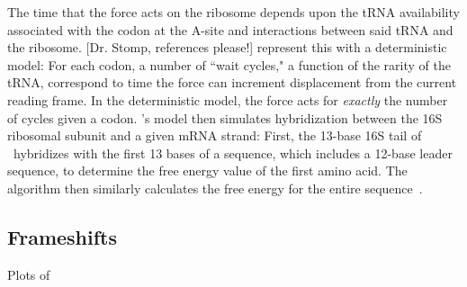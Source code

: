 \documentclass[12pt]{article}
\begin{document}
The time that the force acts on the ribosome depends upon
the tRNA availability associated with the codon at the A-site 
and interactions between said tRNA and the ribosome. [Dr. Stomp, references please!]
\citeauthor{lalit:mechanics} represent this with a deterministic model: For each codon,
a number of ``wait cycles," a function of the rarity of the
tRNA, correspond to time the force can
increment displacement from the current reading frame.  In the
deterministic model, the force acts for \emph{exactly} the number
of cycles given a codon. \citet{lalit:mechanics}'s model then
simulates hybridization between the
16S ribosomal subunit and a given mRNA strand: First, the 13-base 16S
tail of \ecoli\ hybridizes with the first 13 bases of a sequence,
which includes a 12-base leader sequence, to determine the free energy 
value of the first amino acid. The algorithm then similarly calculates
the free energy for the entire sequence~\cite{starmer}.

\subsection{Frameshifts}
\label{section:frameshifts}

\begin{cfigure}
  \caption{Plots of~\prfB}
  \label{prfB:detplots}
\end{cfigure}
\end{document}
